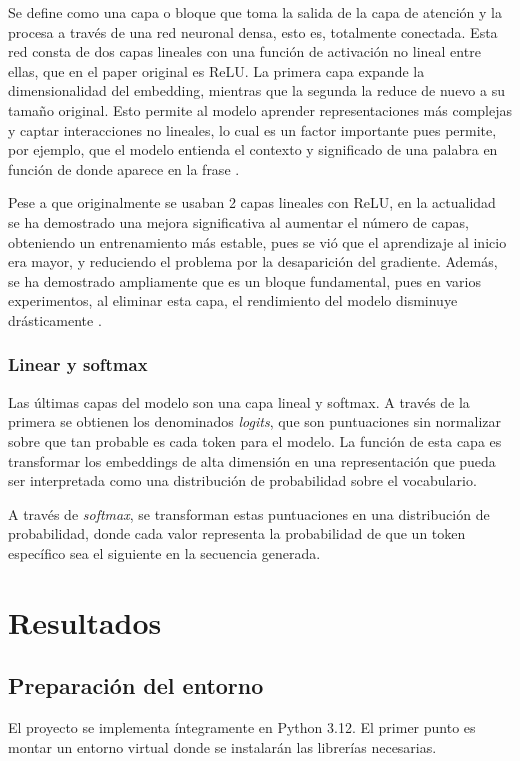 \documentclass[11pt]{book}
\newcommand{\clearemptydoublepage}{\newpage{\pagestyle{empty}\cleardoublepage}}
\begin{document}
Se define como una capa o bloque que toma la salida de la capa de atención y la procesa a través de una red neuronal densa, esto es, totalmente conectada. Esta red consta de dos capas lineales con una función de activación no lineal entre ellas, que en el paper original es ReLU. La primera capa expande la dimensionalidad del embedding, mientras que la segunda la reduce de nuevo a su tamaño original. Esto permite al modelo aprender representaciones más complejas y captar interacciones no lineales, lo cual es un factor importante pues permite, por ejemplo, que el modelo entienda el contexto y significado de una palabra en función de donde aparece en la frase \parencite{kyeg_feedforward_demystified}.

Pese a que originalmente se usaban 2 capas lineales con ReLU, en la actualidad se ha demostrado una mejora significativa al aumentar el número de capas, obteniendo un entrenamiento más estable, pues se vió que el aprendizaje al inicio era mayor, y reduciendo el problema por la desaparición del gradiente. Además, se ha demostrado ampliamente que es un bloque fundamental, pues en varios experimentos, al eliminar esta capa, el rendimiento del modelo disminuye drásticamente \parencite{gerber2025ffn}.


\subsection{Linear y softmax}
Las últimas capas del modelo son una capa lineal y softmax. A través de la primera se obtienen los denominados \textit{logits}, que son puntuaciones sin normalizar sobre que tan probable es cada token para el modelo. La función de esta capa es transformar los embeddings de alta dimensión en una representación que pueda ser interpretada como una distribución de probabilidad sobre el vocabulario.

A través de \textit{softmax}, se transforman estas puntuaciones en una distribución de probabilidad, donde cada valor representa la probabilidad de que un token específico sea el siguiente en la secuencia generada. 


\clearemptydoublepage

\chapter{Resultados}
\section{Preparación del entorno}
El proyecto se implementa íntegramente en Python 3.12. 
El primer punto es montar un entorno virtual donde se instalarán las librerías necesarias.
\end{document}
